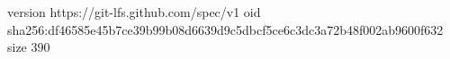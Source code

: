 version https://git-lfs.github.com/spec/v1
oid sha256:df46585e45b7ce39b99b08d6639d9c5dbcf5ce6c3dc3a72b48f002ab9600f632
size 390

